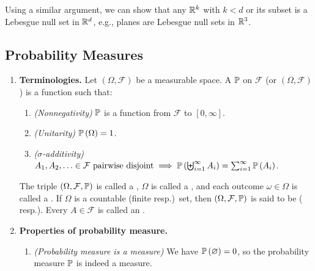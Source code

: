 \begin{enumerate}
\begin{itemize}
\begin{note}
Using a similar argument, we can show that any \(\mathbb{R}^k\) with \(k<d\) or its
subset is a Lebesgue null set in \(\mathbb{R}^d\), e.g., planes are Lebesgue null sets
in \(\mathbb{R}^3\).
\end{note}
\end{itemize}
\end{enumerate}
\subsection{Probability Measures}
\label{subsect:prob-meas}
\begin{enumerate}
\item \textbf{Terminologies.} Let \((\Omega,\mathcal{F})\) be a measurable
space. A  \(\mathbb{P}\) on \(\mathcal{F}\) (or
\((\Omega,\mathcal{F})\)) is a function such that:
\begin{enumerate}[label={(\arabic*)}]
\item \emph{(Nonnegativity)} \(\mathbb{P}\) is a function from \(\mathcal{F}\) to \([0,\infty]\).
\item \emph{(Unitarity)} \(\mathbb{P}\left(\Omega\right)=1\).
\item \emph{(\(\sigma\)-additivity)} \(A_1,A_2,\dotsc\in\mathcal{F}\text{
pairwise disjoint}\implies
\mathbb{P}\left(\biguplus_{i=1}^{\infty}A_i\right)=\sum_{i=1}^{\infty}\mathbb{P}\left(A_i\right)\).
\end{enumerate}
The triple \((\Omega,\mathcal{F},\mathbb{P})\) is called a ,
\(\Omega\) is called a , and each outcome
\(\omega\in\Omega\) is called a . If \(\Omega\) is a
countable (finite resp.)\ set, then \((\Omega,\mathcal{F},\mathbb{P})\) is said to be
 ( resp.).  Every \(A\in\mathcal{F}\) is called an
.

\item\label{it:prob-meas-prop} \textbf{Properties of probability measure.}
\begin{enumerate}
\item \emph{(Probability measure is a measure)} We have
\(\mathbb{P}\left(\varnothing\right)=0\), so the probability measure \(\mathbb{P}\) is indeed a
measure.


\end{enumerate}
\end{enumerate}
